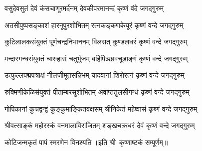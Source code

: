 
\twolineshloka
{वसुदेवसुतं देवं कंसचाणूरमर्दनम्}
{देवकीपरमानन्दं कृष्णं वंदे जगद्गुरुम्}

\twolineshloka
{अतसीपुष्पसङ्काशं हारनूपुरशोभितम्}
{रत्नकङ्कणकेयूरं कृष्णं वन्दे जगद्गुरुम्}

\twolineshloka
{कुटिलालकसंयुक्तं पूर्णचन्द्रनिभाननम्}
{विलसत् कुण्डलधरं कृष्णं वन्दे जगद्गुरुम्}

\twolineshloka
{मन्दारगन्धसंयुक्तं चारुहासं चतुर्भुजम्}
{बर्हिपिञ्छावचूडाङ्गं कृष्णं वन्दे जगद्गुरुम्}

\twolineshloka
{उत्फुल्लपद्मपत्राक्षं नीलजीमूतसन्निभम्}
{यादवानां शिरोरत्नं कृष्णं वन्दे जगद्गुरुम्}

\twolineshloka
{रुक्मिणीकेळिसंयुक्तं पीताम्बरसुशोभितम्}
{अवाप्ततुलसीगन्धं कृष्णं वन्दे जगद्गुरुम्}

\twolineshloka
{गोपिकानां कुचद्वन्द्वं कुङ्कुमाङ्कितवक्षसम्}
{श्रीनिकेतं महेष्वासं कृष्णं वन्दे जगद्गुरुम्}

\twolineshloka
{श्रीवत्साङ्कं महोरस्कं वनमालाविराजितम्}
{शङ्खचक्रधरं देवं कृष्णं वन्दे जगद्गुरुम्}

{कोटिजन्मकृतं पापं स्मरणेन विनश्यति}
॥इति श्री~कृष्णाष्टकं सम्पूर्णम्॥
